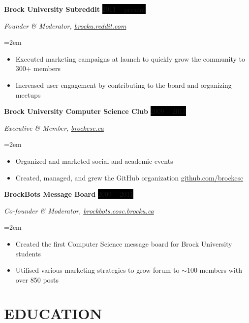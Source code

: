 \documentclass[paper=a4,fontsize=11pt]{scrartcl} %
\newcommand{\getenv}[2][]{%
  \CatchFileEdef{\temp}{"|kpsewhich --var-value #2"}{\endlinechar=-1}%
  \if\relax\detokenize{#1}\relax\temp\else\let#1\temp\fi}
\newcommand{\ifCV}[1]{
  \getenv[\CV]{CV}
  \ifdefstring{\CV}{true}{#1}{}
}
\newcommand{\sepspace}{\vspace*{1em}}     %
\newcommand{\NewPart}[1]{\section*{\uppercase{#1}}}
\newcommand{\EducationEntry}[4]{
    \noindent \textbf{#1} \hfill        %
    \colorbox{Black}{
      \parbox{8.5em}{
      \hfill\color{White}#2}} \par      %
    \noindent \textit{#3} \par          %
    \noindent\hangindent=2em\hangafter=0 \small #4 %
    \normalsize \par}
\newcommand{\OrganizationEntry}[4]{         %
    \noindent \textbf{#1} \hfill            %
    \colorbox{Black}{\color{White}#2} \par  %
    \noindent \textit{#3} \par              %
    \noindent\hangindent=2em\hangafter=0 \small #4 %
    \normalsize \par}
\begin{document}
{\OrganizationEntry{Brock University Subreddit}{2011 -- present}
{Founder \& Moderator, \href{https://brocku.reddit.com/}{brocku.reddit.com}}
{
  \begin{itemize} \itemsep -1pt
    \item Executed marketing campaigns at launch to quickly grow the community to 300+ members
    \item Increased user engagement by contributing to the board and organizing meetups
  \end{itemize}
}
\sepspace

\OrganizationEntry{Brock University Computer Science Club}{2009 -- 2013}
{Executive \& Member, \href{https://brockcsc.ca/}{brockcsc.ca}}
{
  \begin{itemize} \itemsep -1pt
    \item Organized and marketed social and academic events
    \item Created, managed, and grew the GitHub organization \href{https://github.com/brockcsc}{github.com/brockcsc} %
  \end{itemize}
}
\sepspace

\OrganizationEntry{BrockBots Message Board}{2009 -- 2011}
{Co-founder \& Moderator, \href{https://web.archive.org/web/20110208180409/http://brockbots.cosc.brocku.ca/}{brockbots.cosc.brocku.ca}}
{
  \begin{itemize} \itemsep -1pt
    \item Created the first Computer Science message board for Brock University students
    \item Utilised various marketing strategies to grow forum to $\sim$100 members with over 850 posts %
  \end{itemize}
}
} %

\NewPart{Education}{}
\end{document}
